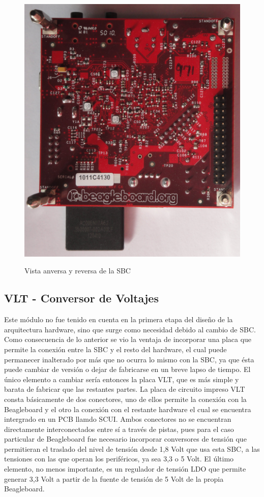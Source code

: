 \begin{figure}[H]
{  \includegraphics[scale=.08 ]{Imagenes/SBC_b.jpg} }

  \caption{Vista anversa y reversa de la SBC}\label{sbcFB}
\end{figure}


\subsection{VLT - Conversor de Voltajes}
Este módulo no fue tenido en cuenta en la primera etapa del diseño de la arquitectura hardware, sino que surge como necesidad debido al cambio de SBC. Como consecuencia de lo anterior se vio la ventaja de incorporar una placa que permite la conexión entre la SBC y el resto del hardware, el cual puede permanecer inalterado por más que no ocurra lo mismo con la SBC, ya que ésta puede cambiar de versión o dejar de fabricarse en un breve lapso de tiempo. El único elemento a cambiar sería entonces la placa VLT, que es más simple y barata de fabricar que las restantes partes.
La placa de circuito impreso VLT consta básicamente de dos conectores, uno de ellos permite la conexión con la Beagleboard y el otro la conexión con el restante hardware el cual se encuentra intergrado en un PCB llamdo SCUI. Ambos conectores no se encuentran directamente interconectados entre sí a través de pistas, pues para el caso particular de Beagleboard fue necesario incorporar conversores de tensión que permitieran el traslado del nivel de tensión desde 1,8 Volt que usa esta SBC, a las tensiones con las que operan los periféricos, ya sea 3,3 o 5 Volt.
El último elemento, no menos importante, es un regulador de tensión LDO que permite generar 3,3 Volt a partir de la fuente de tensión de 5 Volt de la propia Beagleboard.

